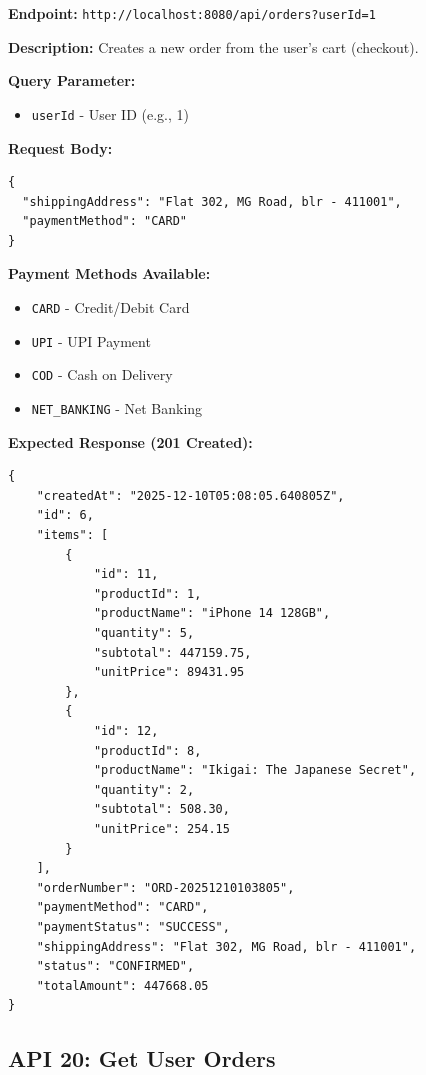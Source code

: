 \documentclass[12pt, a4paper]{article}
\begin{document}
\begin{tcolorbox}[colback=postcolor!10, colframe=postcolor, title=POST]
\textbf{Endpoint:} \texttt{http://localhost:8080/api/orders?userId=1}
\end{tcolorbox}

\textbf{Description:} Creates a new order from the user's cart (checkout).

\textbf{Query Parameter:}
\begin{itemize}
    \item \texttt{userId} - User ID (e.g., 1)
\end{itemize}

\textbf{Request Body:}
\begin{lstlisting}
{
  "shippingAddress": "Flat 302, MG Road, blr - 411001",
  "paymentMethod": "CARD"
}
\end{lstlisting}

\textbf{Payment Methods Available:}
\begin{itemize}
    \item \texttt{CARD} - Credit/Debit Card
    \item \texttt{UPI} - UPI Payment
    \item \texttt{COD} - Cash on Delivery
    \item \texttt{NET\_BANKING} - Net Banking
\end{itemize}

\textbf{Expected Response (201 Created):}
\begin{lstlisting}
{
    "createdAt": "2025-12-10T05:08:05.640805Z",
    "id": 6,
    "items": [
        {
            "id": 11,
            "productId": 1,
            "productName": "iPhone 14 128GB",
            "quantity": 5,
            "subtotal": 447159.75,
            "unitPrice": 89431.95
        },
        {
            "id": 12,
            "productId": 8,
            "productName": "Ikigai: The Japanese Secret",
            "quantity": 2,
            "subtotal": 508.30,
            "unitPrice": 254.15
        }
    ],
    "orderNumber": "ORD-20251210103805",
    "paymentMethod": "CARD",
    "paymentStatus": "SUCCESS",
    "shippingAddress": "Flat 302, MG Road, blr - 411001",
    "status": "CONFIRMED",
    "totalAmount": 447668.05
}
\end{lstlisting}

\vspace{0.5cm}

\subsection{API 20: Get User Orders}
\end{document}
